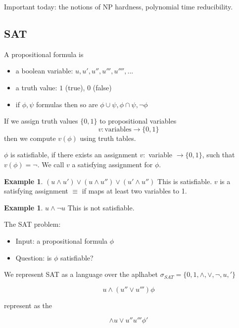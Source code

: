 \documentclass[a4paper,12pt]{article}
\theoremstyle{definition}
\newtheorem{example}[counter]{Example}
\theoremstyle{remark}
\begin{document}
Important today: the notions of NP hardness, polynomial time reducibility.

\subsection{SAT}

A propositional formula is
\begin{itemize}
    \item a boolean variable: $u, u', u'', u''', u'''', ...$
    \item a truth value: $1$ (true), $0$ (false)
    \item if $\phi, \psi$ formulas then so are $\phi \cup \psi, \phi \cap \psi, \neg \phi$
\end{itemize}

If we assign truth values $\{0, 1\}$ to propositional variables
\begin{equation*}
    v: \text{variables} \to \{0, 1\}
\end{equation*}
then we compute $v(\phi)$ using truth tables.

$\phi$ is satisfiable, if there exists an assignment $v:$ variable $\to \{0, 1\}$, such that $v(\phi) = \neg$.
We call $v$ a satisfying assignment for $\phi$.

\begin{example}
    $(u \land u') \lor (u \land u'') \lor (u' \land u'')$
    This is satisfiable. $v$ is a satisfying assignment $\equiv$ if maps at least two variables to 1.
\end{example}

\begin{example}
    $u \land \neg u$
    This is not satisfiable.
\end{example}

The SAT problem:
\begin{itemize}
    \item Input: a propositional formula $\phi$
    \item Question: is $\phi$ satisfiable?
\end{itemize}

We represent SAT as a language over the aplhabet $\sigma_{SAT} = \{0, 1, \land, \lor, \neg, u, '\}$

\begin{equation*}
    u \land (u'' \lor u''') \phi
\end{equation*}

represent as the

\begin{equation*}
    \land u \lor u'' u''' \phi'
\end{equation*}
\end{document}
